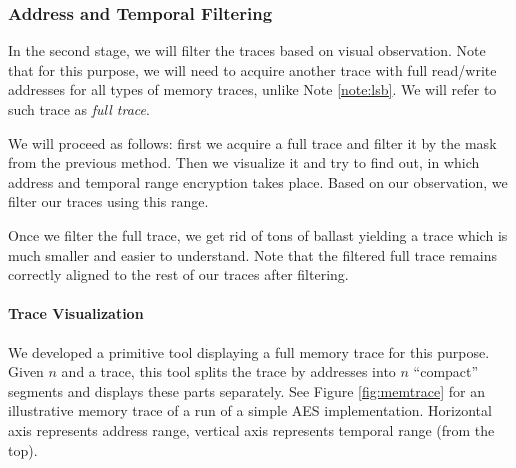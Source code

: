 \subsubsection{Address and Temporal Filtering}
\label{subsec:atf}
	
	In the second stage, we will filter the traces based on visual observation. Note that for this purpose, we will need to acquire another trace with full read/write addresses for all types of memory traces, unlike Note \ref{note:lsb}. We will refer to such trace as {\em full trace}.
	
	We will proceed as follows: first we acquire a full trace and filter it by the mask from the previous method. Then we visualize it and try to find out, in which address and temporal range encryption takes place. Based on our observation, we filter our traces using this range.
	
	\begin{note}
	\label{note:fullfilter}
		Once we filter the full trace, we get rid of tons of ballast yielding a trace which is much smaller and easier to understand. Note that the filtered full trace remains correctly aligned to the rest of our traces after filtering.
	\end{note}
	
	\paragraph{Trace Visualization}
		
		We developed a primitive tool displaying a full memory trace for this purpose. Given $n$ and a trace, this tool splits the trace by addresses into $n$ ``compact'' segments and displays these parts separately. See Figure \ref{fig:memtrace} for an illustrative memory trace of a run of a simple AES implementation. Horizontal axis represents address range, vertical axis represents temporal range (from the top).
		

